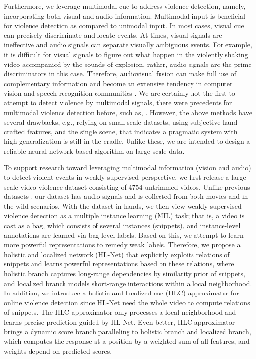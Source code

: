 \documentclass[runningheads]{llncs}
\begin{document}
Furthermore, we leverage multimodal cue to address violence detection, namely, incorporating both visual and audio information. Multimodal input is beneficial for violence detection as compared to unimodal input. In most cases, visual cue can precisely discriminate and locate events. At times, visual signals are ineffective and audio signals can separate visually ambiguous events. For example, it is difficult for visual signals to figure out what happen in the violently shaking video accompanied by the sounds of explosion, rather, audio signals are the prime discriminators in this case. Therefore, audiovisual fusion can make full use of complementary information and become an extensive tendency in computer vision and speech recognition communities \cite{aytar2016soundnet,aytar2017see,senocak2018learning,oh2019speech2face,ginosar2019learning,kazakos2019epic}. We are certainly not the first to attempt to detect violence by multimodal signals, there were precedents for multimodal violence detection before, such as, \cite{zajdel2007cassandra,lin2009weakly,giannakopoulos2010audio,penet2012multimodal}. However, the above methods have several drawbacks, e.g., relying on small-scale datasets, using subjective hand-crafted features, and the single scene, that indicates a pragmatic system with high generalization is still in the cradle. Unlike these, we are intended to design a reliable neural network based algorithm on large-scale data.


To support research toward leveraging multimodal information (vision and audio) to detect violent events in weakly supervised perspective, we first release a large-scale video violence dataset consisting of 4754 untrimmed videos. Unlike previous datasets \cite{nievas2011violence,hassner2012violent,demarty2015vsd,sultani2018real}, our dataset has audio signals and is collected from both movies and in-the-wild scenarios. With the dataset in hands, we then view weakly supervised violence detection as a multiple instance learning (MIL) task; that is, a video is cast as a bag, which consists of several instances (snippets), and instance-level annotations are learned via bag-level labels. Based on this, we attempt to learn more powerful representations to remedy weak labels. Therefore, we propose a holistic and localized network (HL-Net) that explicitly exploits relations of snippets and learns powerful representations based on these relations, where holistic branch captures long-range dependencies by similarity prior of snippets, and localized branch models short-range interactions within a local neighborhood. 
In addition, we introduce a holistic and localized cue (HLC) approximator for online violence detection since HL-Net need the whole video to compute relations of snippets. The HLC approximator only processes a local neighborhood and learns precise prediction guided by HL-Net. Even better, HLC approximator brings a dynamic score branch paralleling to holistic branch and localized branch, which computes the response at a position by a weighted sum of all features, and weights depend on predicted scores.
\end{document}
